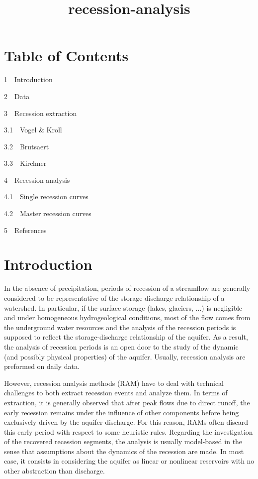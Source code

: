 \documentclass[11pt]{article}
\title{recession-analysis}
\begin{document}
    
    
    \maketitle
    
    

    
    \section{Table of Contents}\label{table-of-contents}

{1~~}Introduction

{2~~}Data

{3~~}Recession extraction

{3.1~~}Vogel \& Kroll

{3.2~~}Brutsaert

{3.3~~}Kirchner

{4~~}Recession analysis

{4.1~~}Single recession curves

{4.2~~}Master recession curves

{5~~}References

    \section{Introduction}\label{introduction}

In the absence of precipitation, periods of recession of a streamflow
are generally considered to be representative of the storage-discharge
relationship of a watershed. In particular, if the surface storage
(lakes, glaciers, ...) is negligible and under homogeneous
hydrogeological conditions, most of the flow comes from the underground
water resources and the analysis of the recession periods is supposed to
reflect the storage-discharge relationship of the aquifer. As a result,
the analysis of recession periods is an open door to the study of the
dynamic (and possibly physical properties) of the aquifer. Usually,
recession analysis are preformed on daily data.

However, recession analysis methods (RAM) have to deal with technical
challenges to both extract recession events and analyze them. In terms
of extraction, it is generally observed that after peak flows due to
direct runoff, the early recession remains under the influence of other
components before being exclusively driven by the aquifer discharge. For
this reason, RAMs often discard this early period with respect to some
heuristic rules. Regarding the investigation of the recovered recession
segments, the analysis is usually model-based in the sense that
assumptions about the dynamics of the recession are made. In most case,
it consists in considering the aquifer as linear or nonlinear reservoirs
with no other abstraction than discharge.
\end{document}
